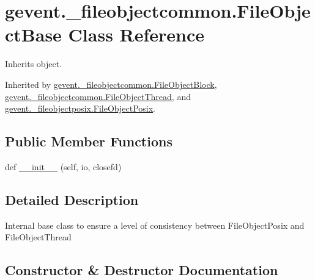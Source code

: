 \hypertarget{classgevent_1_1__fileobjectcommon_1_1_file_object_base}{}\section{gevent.\+\_\+fileobjectcommon.\+File\+Object\+Base Class Reference}
\label{classgevent_1_1__fileobjectcommon_1_1_file_object_base}


Inherits object.



Inherited by \hyperlink{classgevent_1_1__fileobjectcommon_1_1_file_object_block}{gevent.\+\_\+fileobjectcommon.\+File\+Object\+Block}, \hyperlink{classgevent_1_1__fileobjectcommon_1_1_file_object_thread}{gevent.\+\_\+fileobjectcommon.\+File\+Object\+Thread}, and \hyperlink{classgevent_1_1__fileobjectposix_1_1_file_object_posix}{gevent.\+\_\+fileobjectposix.\+File\+Object\+Posix}.

\subsection*{Public Member Functions}
\begin{DoxyCompactItemize}
\item 
def \hyperlink{classgevent_1_1__fileobjectcommon_1_1_file_object_base_a3545a45e0add9043bb64da8bc64b3032}{\+\_\+\+\_\+init\+\_\+\+\_\+} (self, io, closefd)
\end{DoxyCompactItemize}


\subsection{Detailed Description}
\begin{DoxyVerb}Internal base class to ensure a level of consistency
between FileObjectPosix and FileObjectThread
\end{DoxyVerb}
 

\subsection{Constructor \& Destructor Documentation}
\mbox{\label{classgevent_1_1__fileobjectcommon_1_1_file_object_base_a3545a45e0add9043bb64da8bc64b3032}} 
